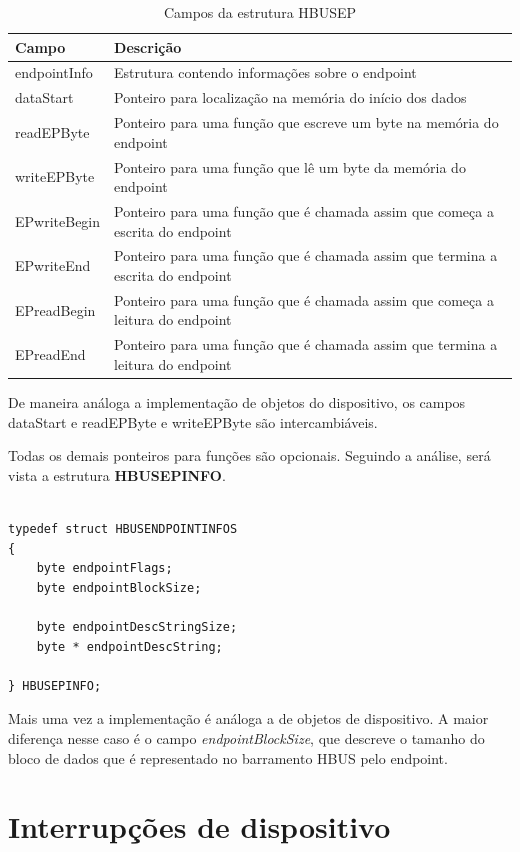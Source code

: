\documentclass[11pt]{report}
\begin{document}
\begin{table}[H]
\centering
\caption{Campos da estrutura HBUSEP}
\begin{tabular}{l p{12cm}}

\hline
Campo					&	Descrição\\
\hline
endpointInfo				&	Estrutura contendo informações sobre o endpoint\\
dataStart				&	Ponteiro para localização na memória do início dos dados\\
readEPByte				&	Ponteiro para uma função que escreve um byte na memória do endpoint\\
writeEPByte				&	Ponteiro para uma função que lê um byte da memória do endpoint\\
EPwriteBegin				&	Ponteiro para uma função que é chamada assim que começa a escrita do endpoint\\
EPwriteEnd				&	Ponteiro para uma função que é chamada assim que termina a escrita do endpoint\\
EPreadBegin				&	Ponteiro para uma função que é chamada assim que começa a leitura do endpoint\\
EPreadEnd				&	Ponteiro para uma função que é chamada assim que termina a leitura do endpoint\\
\hline

\end{tabular}
\end{table}

De maneira análoga a implementação de objetos do dispositivo, os campos dataStart e readEPByte e writeEPByte são intercambiáveis.

Todas os demais ponteiros para funções são opcionais. Seguindo a análise, será vista a estrutura \textbf{HBUSEPINFO}.

\begin{verbatim}

typedef struct HBUSENDPOINTINFOS
{
	byte endpointFlags;
	byte endpointBlockSize;
	
	byte endpointDescStringSize;
	byte * endpointDescString;
	
} HBUSEPINFO;

\end{verbatim}

Mais uma vez a implementação é análoga a de objetos de dispositivo. A maior diferença nesse caso é o campo \textit{endpointBlockSize}, que descreve o tamanho do bloco de dados que é representado no barramento HBUS pelo endpoint.

\section{Interrupções de dispositivo}
\end{document}
